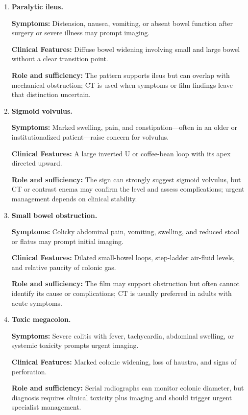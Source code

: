 \begin{enumerate}[leftmargin=*,itemsep=0.45em,topsep=0.4em]
\item \textbf{Paralytic ileus.}\par\noindent\textbf{Symptoms:} Distension, nausea, vomiting, or absent bowel function after surgery or severe illness may prompt imaging.\par\noindent\textbf{Clinical Features:} Diffuse bowel widening involving small and large bowel without a clear transition point.\par\noindent\textbf{Role and sufficiency:} The pattern supports ileus but can overlap with mechanical obstruction; CT is used when symptoms or film findings leave that distinction uncertain.
\item \textbf{Sigmoid volvulus.}\par\noindent\textbf{Symptoms:} Marked swelling, pain, and constipation—often in an older or institutionalized patient—raise concern for volvulus.\par\noindent\textbf{Clinical Features:} A large inverted U or coffee-bean loop with its apex directed upward.\par\noindent\textbf{Role and sufficiency:} The sign can strongly suggest sigmoid volvulus, but CT or contrast enema may confirm the level and assess complications; urgent management depends on clinical stability.
\item \textbf{Small bowel obstruction.}\par\noindent\textbf{Symptoms:} Colicky abdominal pain, vomiting, swelling, and reduced stool or flatus may prompt initial imaging.\par\noindent\textbf{Clinical Features:} Dilated small-bowel loops, step-ladder air-fluid levels, and relative paucity of colonic gas.\par\noindent\textbf{Role and sufficiency:} The film may support obstruction but often cannot identify its cause or complications; CT is usually preferred in adults with acute symptoms.
\item \textbf{Toxic megacolon.}\par\noindent\textbf{Symptoms:} Severe colitis with fever, tachycardia, abdominal swelling, or systemic toxicity prompts urgent imaging.\par\noindent\textbf{Clinical Features:} Marked colonic widening, loss of haustra, and signs of perforation.\par\noindent\textbf{Role and sufficiency:} Serial radiographs can monitor colonic diameter, but diagnosis requires clinical toxicity plus imaging and should trigger urgent specialist management.
\end{enumerate}


